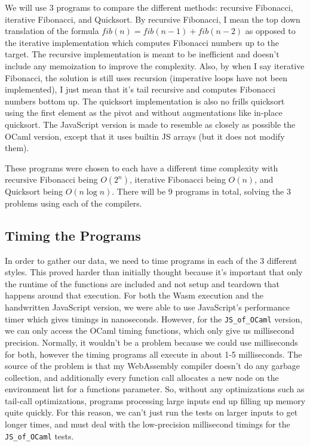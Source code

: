 \documentclass[12pt,a4paper,twoside,openright]{report}
\newcommand{\JSofOCaml}{{\tt JS\_of\_OCaml} }
\begin{document}
We will use 3 programs to compare the different methods: recursive Fibonacci, iterative Fibonacci, and Quicksort.
By recursive Fibonacci, I mean the top down translation of the formula $fib(n) = fib(n-1) + fib(n - 2)$ as opposed to the iterative implementation which computes Fibonacci numbers up to the target.
The recursive implementation is meant to be inefficient and doesn't include any memoization to improve the complexity.
Also, by when I say iterative Fibonacci, the solution is still uses recursion (imperative loops have not been implemented), I just mean that it's tail recursive and computes Fibonacci numbers bottom up.
The quicksort implementation is also no frills quicksort using the first element as the pivot and without augmentations like in-place quicksort.
The JavaScript version is made to resemble as closely as possible the OCaml version, except that it uses builtin JS arrays (but it does not modify them).

These programs were chosen to each have a different time complexity with recursive Fibonacci being $O(2^n)$, iterative Fibonacci being $O(n)$, and Quicksort being $O(n\log{}n)$.
There will be 9 programs in total, solving the 3 problems using each of the compilers.

\subsection{Timing the Programs}
In order to gather our data, we need to time programs in each of the 3 different styles.
This proved harder than initially thought because it's important that only the runtime of the functions are included and not setup and teardown that happens around that execution.
For both the Wasm execution and the handwritten JavaScript version, we were able to use JavaScript's performance timer which gives timings in nanoseconds.
However, for the \JSofOCaml version, we can only access the OCaml timing functions, which only give us millisecond precision.
Normally, it wouldn't be a problem because we could use milliseconds for both, however the timing programs all execute in about 1-5 milliseconds.
The source of the problem is that my WebAssembly compiler doesn't do any garbage collection, and additionally every function call allocates a new node on the environment list for a functions parameter.
So, without any optimizations such as tail-call optimizations, programs processing large inputs end up filling up memory quite quickly.
For this reason, we can't just run the tests on larger inputs to get longer times, and must deal with the low-precision millisecond timings for the \JSofOCaml tests.
\end{document}
